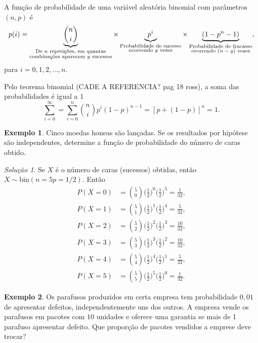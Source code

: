 \documentclass[]{book}
\theoremstyle{definition}
\theoremstyle{definition}
\newtheorem{example}{Exemplo}[chapter]
\theoremstyle{definition}
\theoremstyle{remark}
\newtheorem*{solution}{Solução}
\begin{document}
A função de probabilidade de uma variável aleatória binomial com parâmetros \((n,p)\) é
\[p(i) = \underbrace{n \choose i}_{\substack{\small{\text{De $n$ repetições, em quantas}} \\ \small{\text{combinações aparecem $y$ sucessos}}}} \times \underbrace{p^i}_{\substack{\small{\text{Probabilidade de sucesso}} \\ \small{\text{ocorrendo $y$ vezes}}}} \times \underbrace{(1-p^n-1{})}_{\substack{\small{\text{Probabilidade de fracasso}} \\ \small{\text{ocorrendo $(n-y)$ vezes}}}},\]
para \(i=0,1,2,\ldots,n\).

Pelo teorema binomial (CADE A REFERENCIA? pag 18 ross), a soma das probabilidades é igual a \(1\)
\[\sum_{i=0}^{\infty} = \sum_{i=0}^{n}{n \choose i}p^i(1-p)^{n-1} = [p+(1-p)]^n=1.\]

\begin{example}
\protect\hypertarget{exm:unnamed-chunk-183}{}{\label{exm:unnamed-chunk-183} }Cinco moedas honeas são lançadas.
Se os resultados por hipótese são independentes, determine a função de probabilidade do número de caras obtido.
\end{example}

\begin{solution}
\iffalse{} {Solução. } \fi{}Se \(X\) é o número de caras (sucessos) obtidas, então \(X\sim \mathrm{bin}(n=5p=1/2)\).
Então
\begin{align}
P(X=0) &= {5 \choose 0} \bigg(\frac{1}{2}\bigg)^0 \bigg(\frac{1}{2}\bigg)^5 = \frac{1}{32},\\
P(X=1) &= {5 \choose 1} \bigg(\frac{1}{2}\bigg)^1 \bigg(\frac{1}{2}\bigg)^4 = \frac{5}{32},\\
P(X=2) &= {5 \choose 2} \bigg(\frac{1}{2}\bigg)^2 \bigg(\frac{1}{2}\bigg)^3 = \frac{10}{32},\\
P(X=3) &= {5 \choose 3} \bigg(\frac{1}{2}\bigg)^3 \bigg(\frac{1}{2}\bigg)^2 = \frac{10}{32},\\
P(X=4) &= {5 \choose 4} \bigg(\frac{1}{2}\bigg)^4 \bigg(\frac{1}{2}\bigg)^1 = \frac{5}{32},\\
P(X=5) &= {5 \choose 5} \bigg(\frac{1}{2}\bigg)^5 \bigg(\frac{1}{2}\bigg)^0 = \frac{1}{32}.
\end{align}
\end{solution}

\begin{example}
\protect\hypertarget{exm:unnamed-chunk-185}{}{\label{exm:unnamed-chunk-185} }Os parafusos produzidos em certa empresa tem probabilidade \(0{,}01\) de apresentar defeitos, independentemente uns dos outros.
A empresa vende os parafusos em pacotes com \(10\) unidades e oferece uma garantia se mais de 1 parafuso apresentar defeito.
Que proporção de pacotes vendidos a emprese deve trocar?
\end{example}
\end{document}

